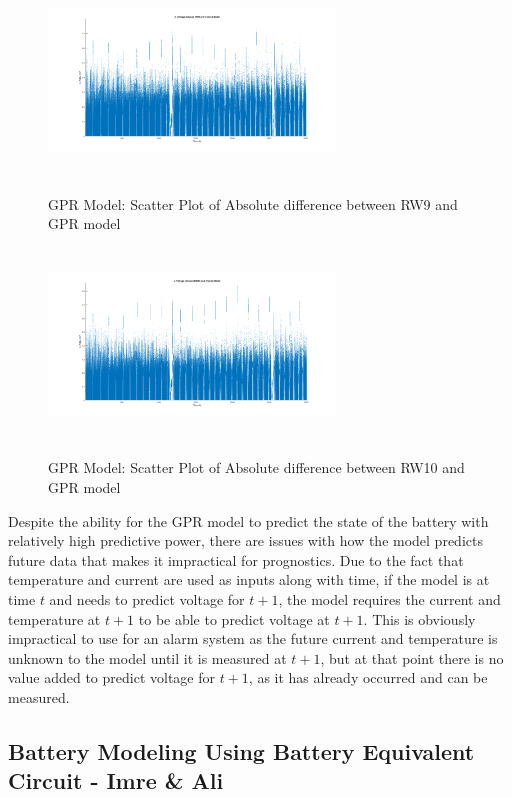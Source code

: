 \begin{figure}
\begin{multicols}{2}
	\includegraphics[height=2in, width=3in]{figures/GPR/rw9_abs_v_diff}
	\caption{GPR Model: Scatter Plot of Absolute difference between RW9 and GPR model}
	\label{fig:rw9_abs_v_diff}
	\includegraphics[height=2in, width=3in]{figures/GPR/rw10_abs_v_diff}
	\caption{GPR Model: Scatter Plot of Absolute difference between RW10 and GPR model}
	\label{fig:rw10_abs_v_diff}
\end{multicols}
\end{figure}

Despite the ability for the GPR model to predict the state of the battery with relatively high predictive power, there are issues with how the model predicts future data that makes it impractical for prognostics.  Due to the fact that temperature and current are used as inputs along with time, if the model is at time $t$ and needs to predict voltage for $t+1$, the model requires the current and temperature at $t+1$ to be able to predict voltage at $t+1$.  This is obviously impractical to use for an alarm system as the future current and temperature is unknown to the model until it is measured at $t+1$, but at that point there is no value added to predict voltage for $t+1$, as it has already occurred and can be measured.

\subsection{Battery Modeling Using Battery Equivalent Circuit - Imre \& Ali}

